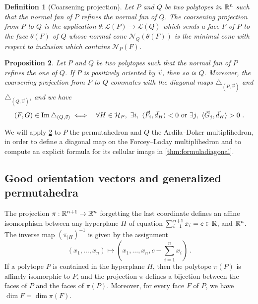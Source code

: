 \documentclass[twoside, 11pt]{amsart}
\newtheorem{definition}{Definition}[section]
\newtheorem{proposition}[definition]{Proposition}
\theoremstyle{remark}
\begin{document}
\begin{definition}[Coarsening projection] 
  \label{def:coarseningprojection} 
  Let $P$ and $Q$ be two polytopes in $\mathbb{R}^n$ such that the normal fan of $P$ refines the normal fan of $Q$. 
  The \emph{coarsening projection} from $P$ to $Q$ is the application $\theta : \mathcal{L}(P)\to\mathcal{L}(Q)$ which sends a face $F$ of $P$ to the face $\theta(F)$ of $Q$ whose normal cone $\mathcal{N}_Q(\theta(F))$ is the minimal cone with respect to inclusion which contains $\mathcal{N}_P(F)$.
\end{definition}

\begin{proposition} 
\label{prop:refinementofnormalfans}
Let $P$ and $Q$ be two polytopes such that the normal fan of $P$ refines the one of $Q$. 
If $P$ is positively oriented by $\vec v$, then so is $Q$. 
Moreover, the coarsening projection from $P$ to $Q$ commutes with the diagonal maps $\triangle_{(P,\vec v)}$ and $\triangle_{(Q,\vec v)}$, and we have 
\begin{eqnarray*}
  (F,G) \in \operatorname{Im} \triangle_{(Q,\vec v)} 
  &\iff& \forall H \in \mathcal{H}_P , \ \exists i , \ \langle \vec F_i, \vec d_H \rangle < 0  \text{ or } \exists j , \ \langle \vec G_j, \vec d_H \rangle > 0 \ .
\end{eqnarray*} 
\end{proposition}

We will apply \cref{prop:refinementofnormalfans} to $P$ the permutahedron and $Q$ the Ardila--Doker multiplihedron, in order to define a diagonal map on the Forcey--Loday multiplihedron and to compute an explicit formula for its cellular image in \cref{thm:formuladiagonal}.


\subsection{Good orientation vectors and generalized permutahedra}

The projection $\pi : \mathbb{R}^{n+1} \to \mathbb{R}^n$ forgetting the last coordinate defines an affine isomorphism between any hyperplane $H$ of equation $\sum_{i=1}^{n+1} x_i = c \in \mathbb{R}$, and $\mathbb{R}^n$. 
The inverse map $(\pi_{| H})^{-1}$ is given by the assignment \[ (x_1, \ldots, x_n) \mapsto \left(x_1, \ldots, x_n, c- \sum_{i=1}^{n}x_i\right) \ . \]
If a polytope $P$ is contained in the hyperplane $H$, then the polytope $\pi(P)$ is affinely isomorphic to $P$, and the projection $\pi$ defines a bijection between the faces of $P$ and the faces of $\pi(P)$. Moreover, for every face $F$ of $P$, we have $\dim F = \dim \pi(F)$.
\end{document}
